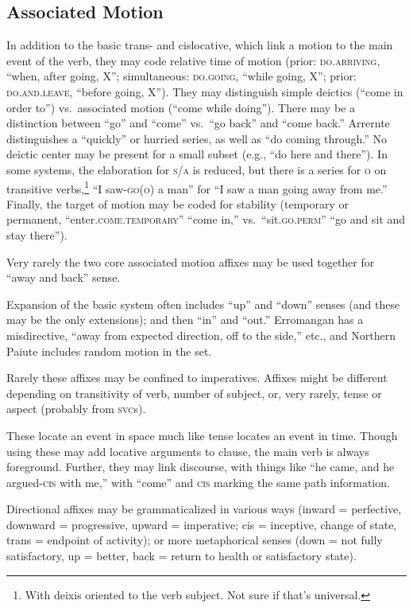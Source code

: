 \documentclass[11pt]{article}
\newcommand{\I}[1]{\textsc{#1}}   %
\begin{document}
\subsection{Associated Motion}
In addition to the basic trans- and cislocative, which link a motion
to the main event of the verb, they may code relative time of motion
(prior: \I{do.arriving}, ``when, after going, X''; simultaneous:
\I{do.going}, ``while going, X''; prior: \I{do.and.leave}, ``before
going, X''). They may distinguish simple deictics (``come in order
to'') vs.\ associated motion (``come while doing'').  There may be a
distinction between ``go'' and ``come'' vs.\ ``go back'' and ``come
back.''  Arrernte distinguishes a ``quickly'' or hurried series, as
well as ``do coming through.''  No deictic center may be present for a
small subset (e.g., ``do here and there'').  In some systems, the
elaboration for \I{s/a} is reduced, but there is a series for \I{o} on
transitive verbs,\footnote{With deixis oriented to the verb subject.
Not sure if that's universal.} ``I saw-\I{go(o)} a man'' for ``I saw
a man going away from me.''  Finally, the target of motion may be
coded for stability (temporary or permanent,
``enter.\I{come.temporary}'' ``come in,'' vs.\ ``sit.\I{go.perm}''
``go and sit and stay there'').  

Very rarely the two core associated motion affixes may be used
together for ``away and back'' sense.

Expansion of the basic system often includes ``up'' and ``down''
senses (and these may be the only extensions); and then ``in'' and
``out.''  Erromangan has a misdirective, ``away from expected
direction, off to the side,'' etc., and Northern Paiute includes
random motion in the set.

Rarely these affixes may be confined to imperatives.  Affixes might be
different depending on transitivity of verb, number of subject, or,
very rarely, tense or aspect (probably from \I{svc}s).

These locate an event in space much like tense locates an event in
time.  Though using these may add locative arguments to clause, the
main verb is always foreground.  Further, they may link discourse,
with things like ``he came, and he argued-\I{cis} with me,'' with
``come'' and \I{cis} marking the same path information.

Directional affixes may be grammaticalized in various ways (inward =
perfective, downward = progressive, upward = imperative; cis =
inceptive, change of state, trans = endpoint of activity); or more
metaphorical senses (down = not fully satisfactory, up = better, back
= return to health or satisfactory state).
\end{document}

